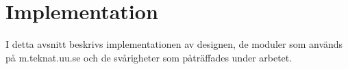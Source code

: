 \section{Implementation}
I detta avsnitt beskrivs implementationen av designen, de moduler som används på
m.teknat.uu.se och de svårigheter som påträffades under arbetet.



